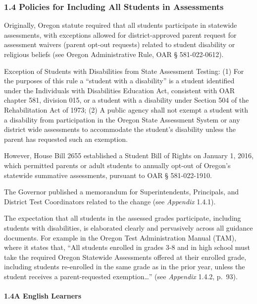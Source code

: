 \documentclass[]{article}
\let\oldparagraph\paragraph
\renewcommand{\paragraph}[1]{\oldparagraph{#1}\mbox{}}
\begin{document}
\subsubsection{1.4 Policies for Including All Students in
Assessments}\label{policies-for-including-all-students-in-assessments}

Originally, Oregon statute required that all students participate in
statewide assessments, with exceptions allowed for district-approved
parent request for assessment waivers (parent opt-out requests) related
to student disability or religious beliefs (see Oregon Administrative
Rule, OAR § 581-022-0612).

Exception of Students with Disabilities from State Assessment Testing:
(1) For the purposes of this rule a ``student with a disability'' is a
student identified under the Individuals with Disabilities Education
Act, consistent with OAR chapter 581, division 015, or a student with a
disability under Section 504 of the Rehabilitation Act of 1973; (2) A
public agency shall not exempt a student with a disability from
participation in the Oregon State Assessment System or any district wide
assessments to accommodate the student's disability unless the parent
has requested such an exemption.

However, House Bill 2655 established a Student Bill of Rights on January
1, 2016, which permitted parents or adult students to annually opt-out
of Oregon's statewide summative assessments, pursuant to OAR §
581-022-1910.

The Governor published a memorandum for Superintendents, Principals, and
District Test Coordinators related to the change (see \emph{Appendix}
1.4.1).

The expectation that all students in the assessed grades participate,
including students with disabilities, is elaborated clearly and
pervasively across all guidance documents. For example in the Oregon
Test Administration Manual (TAM), where it states that, ``All students
enrolled in grades 3-8 and in high school must take the required Oregon
Statewide Assessments offered at their enrolled grade, including
students re-enrolled in the same grade as in the prior year, unless the
student receives a parent-requested exemption\ldots{}'' (see
\emph{Appendix} 1.4.2, p.~93).

\paragraph{1.4A English Learners}\label{a-english-learners}
\end{document}
